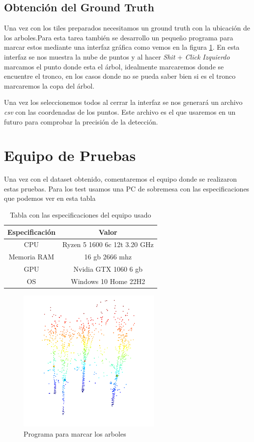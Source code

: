 \subsection{Obtención del Ground Truth}
Una vez con los tiles preparados necesitamos un ground truth con la ubicación de los arboles.Para esta tarea también se desarrollo un pequeño programa para marcar estos mediante una interfaz gráfica como vemos en la figura \ref{fig:labelTile}.
En esta interfaz se nos muestra la nube de puntos y al hacer \textit{Shit} + \textit{Click Izquierdo} marcamos el punto donde esta el árbol, idealmente marcaremos donde se encuentre el tronco, en los casos donde no se pueda saber bien si es el tronco marcaremos la copa del árbol.

Una vez los seleccionemos todos al cerrar la interfaz se nos generará un archivo \textit{csv} con las coordenadas de los puntos. Este archivo es el que usaremos en un futuro para comprobar la precisión de la detección.

\section{Equipo de Pruebas}
Una vez con el dataset obtenido, comentaremos el equipo donde se realizaron estas pruebas. Para los test usamos una PC de sobremesa con las especificaciones que podemos ver en esta tabla 

\begin{table}[h]
\centering
{}
\begin{tabular}{c|c}
\rowcolor{udcpink!25}
\textbf{Especificación} & \textbf{Valor} \\\hline

CPU & Ryzen 5 1600 6c 12t 3.20 GHz\\
Memoria RAM & 16 gb 2666 mhz \\
GPU & Nvidia GTX 1060 6 gb \\
OS & Windows 10 Home 22H2 \\


\end{tabular}
\caption{Tabla con las especificaciones del equipo usado}
\label{tabcospes}
\end{table}


\begin{figure}[h]
\centering
    \includegraphics[width=7cm]{imaxes/marking.png}
    \caption{Programa para marcar los arboles}
    \label{fig:labelTile}
\end{figure}

